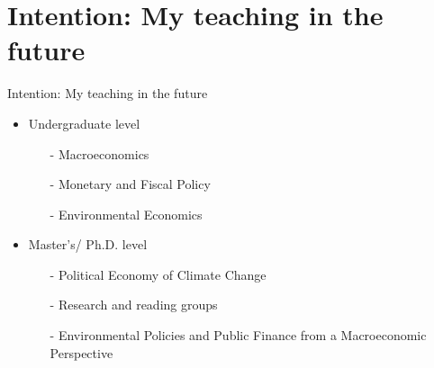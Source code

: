 \section*{Intention: My teaching in the future}
\begin{frame}{Intention: My teaching in the future}


\begin{itemize}[<+->]
	\item Undergraduate level
	\begin{itemize}
		\item[-] Macroeconomics
		\item[-] Monetary and Fiscal Policy
		\item[-] Environmental Economics 
	\end{itemize}
\vspace{2mm}
	\item Master's/ Ph.D. level
	\begin{itemize}
		\item[-] Political Economy of Climate Change
		\item[-] Research and reading groups
		\item[-] Environmental Policies and Public Finance from a Macroeconomic Perspective
	\end{itemize}
\end{itemize}
\end{frame}

